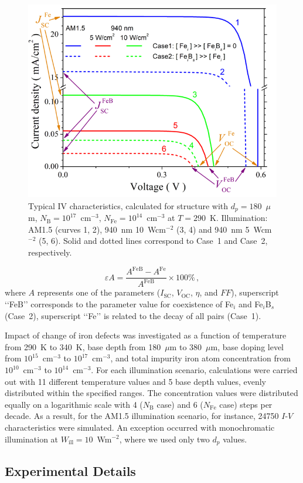 \documentclass[a4paper,fleqn]{cas-sc}
\begin{document}
\begin{figure}
	\centering
		\includegraphics[width=0.5\linewidth]{Figure2.png}
	  \caption{Typical IV characteristics,
   calculated for structure with $d_p = 180$~$\mu$m, $N_\mathrm{B}=10^{17}$~cm$^{-3}$,
   $N_\mathrm{Fe}=10^{14}$~cm$^{-3}$ at $T = 290$~K.
   Illumination: AM1.5 (curves 1, 2), 940~nm 10~Wcm$^{-2}$ (3, 4) and 940~nm 5~Wcm$^{-2}$ (5, 6).
   Solid and dotted lines correspond to Case~1 and Case~2, respectively.}\label{fig2}
\end{figure}


\begin{equation}
\label{eq1}
    \varepsilon A = \frac{A^\mathrm{FeB} - A^\mathrm{Fe}}{A^\mathrm{FeB}} \times 100 \%\,,
\end{equation}
where $A$ represents one of the parameters ($I_\mathrm{SC}$, $V_\mathrm{OC}$, $\eta$, and $FF$),
superscript ‘‘FeB’’ corresponds to the parameter value for coexistence of Fe$_i$ and Fe$_i$B$_s$ (Case~2),
superscript ‘‘Fe’’ is related to the decay of all pairs (Case~1).


Impact of change of iron defects was investigated as a function of temperature from 290~K to 340~K,
base depth from 180~$\mu$m to 380~$\mu$m,
base doping level from $10^{15}$~cm$^{-3}$ to $10^{17}$~cm$^{-3}$,
and total impurity iron atom concentration from $10^{10}$~cm$^{-3}$ to $10^{14}$~cm$^{-3}$.
For each illumination scenario, calculations were carried out with 11 different temperature values and 5 base depth values,
evenly distributed within the specified ranges.
The concentration values were distributed equally on a logarithmic scale with 4 ($N_\mathrm{B}$ case) and 6 ($N_\mathrm{Fe}$ case) steps per decade.
As a result, for the AM1.5 illumination scenario, for instance, 24750 $I$-$V$ characteristics were simulated.
An exception occurred with monochromatic illumination at $W_\mathrm{ill} = 10$~Wm$^{-2}$,
where we used only two $d_p$ values.

\subsection{Experimental Details}
\end{document}
